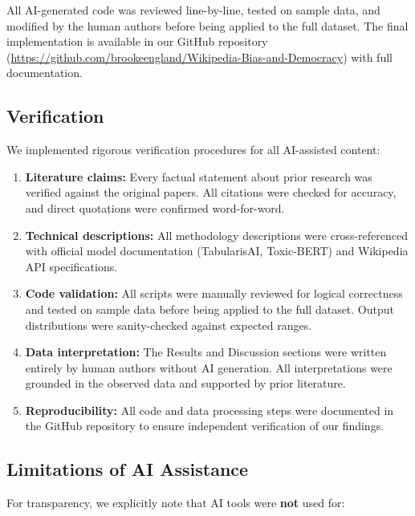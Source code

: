 All AI-generated code was reviewed line-by-line, tested on sample data, and modified by the human authors before being applied to the full dataset. The final implementation is available in our GitHub repository (\url{https://github.com/brookeengland/Wikipedia-Bias-and-Democracy}) with full documentation.

\subsection{Verification}

We implemented rigorous verification procedures for all AI-assisted content:

\begin{enumerate}
    \item \textbf{Literature claims:} Every factual statement about prior research was verified against the original papers. All citations were checked for accuracy, and direct quotations were confirmed word-for-word.
    
    \item \textbf{Technical descriptions:} All methodology descriptions were cross-referenced with official model documentation (TabularisAI, Toxic-BERT) and Wikipedia API specifications.
    
    \item \textbf{Code validation:} All scripts were manually reviewed for logical correctness and tested on sample data before being applied to the full dataset. Output distributions were sanity-checked against expected ranges.
    
    \item \textbf{Data interpretation:} The Results and Discussion sections were written entirely by human authors without AI generation. All interpretations were grounded in the observed data and supported by prior literature.
    
    \item \textbf{Reproducibility:} All code and data processing steps were documented in the GitHub repository to ensure independent verification of our findings.
\end{enumerate}

\subsection{Limitations of AI Assistance}

For transparency, we explicitly note that AI tools were \textbf{not} used for:

